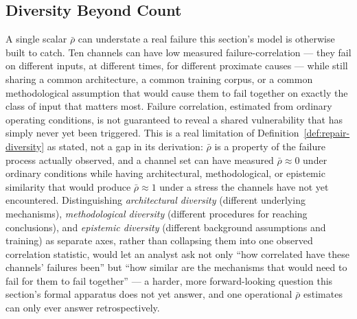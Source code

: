 \documentclass[11pt,a4paper]{article}
\theoremstyle{plain}
\theoremstyle{definition}
\theoremstyle{remark}
\begin{document}
\subsection{Diversity Beyond Count}
\label{subsec:diversity-beyond-count}

A single scalar $\bar\rho$ can understate a real failure this section's model is otherwise built to catch. Ten channels can have low measured failure-correlation — they fail on different inputs, at different times, for different proximate causes — while still sharing a common architecture, a common training corpus, or a common methodological assumption that would cause them to fail together on exactly the class of input that matters most. Failure correlation, estimated from ordinary operating conditions, is not guaranteed to reveal a shared vulnerability that has simply never yet been triggered. This is a real limitation of Definition~\ref{def:repair-diversity} as stated, not a gap in its derivation: $\bar\rho$ is a property of the failure process actually observed, and a channel set can have measured $\bar\rho \approx 0$ under ordinary conditions while having architectural, methodological, or epistemic similarity that would produce $\bar\rho \approx 1$ under a stress the channels have not yet encountered. Distinguishing \emph{architectural diversity} (different underlying mechanisms), \emph{methodological diversity} (different procedures for reaching conclusions), and \emph{epistemic diversity} (different background assumptions and training) as separate axes, rather than collapsing them into one observed correlation statistic, would let an analyst ask not only ``how correlated have these channels' failures been'' but ``how similar are the mechanisms that would need to fail for them to fail together'' — a harder, more forward-looking question this section's formal apparatus does not yet answer, and one operational $\bar\rho$ estimates can only ever answer retrospectively.
\end{document}
